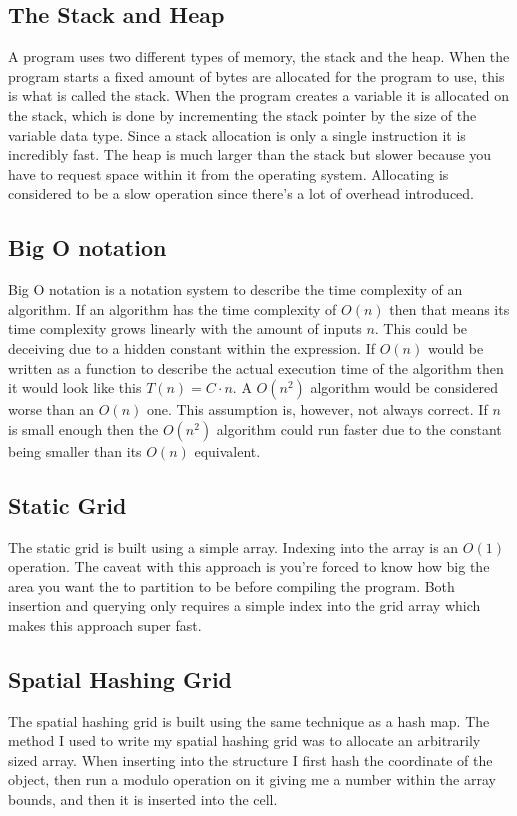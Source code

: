 \documentclass[a4paper, 12pt]{article}
\begin{document}
\subsection{The Stack and Heap}
A program uses two different types of memory, the stack and the heap. When the
program starts a fixed amount of bytes are allocated for the program to use,
this is what is called the stack. When the program creates a variable it is
allocated on the stack, which is done by incrementing the stack pointer by the
size of the variable data type. Since a stack allocation is only a single
instruction it is incredibly fast. The heap is much larger than the stack but
slower because you have to request space within it from the operating system.
Allocating is considered to be a slow operation since there's a lot of overhead
introduced.

\subsection{Big O notation}
Big O notation is a notation system to describe the time complexity of an
algorithm. If an algorithm has the time complexity of $O(n)$ then that means
its time complexity grows linearly with the amount of inputs $n$. This could be
deceiving due to a hidden constant within the expression. If $O(n)$ would be
written as a function to describe the actual execution time of the algorithm
then it would look like this $T(n) = C \cdot n$. A $O(n^{2})$ algorithm would
be considered worse than an $O(n)$ one. This assumption is, however, not always
correct. If $n$ is small enough then the $O(n^{2})$ algorithm could run faster
due to the constant being smaller than its $O(n)$ equivalent.

\subsection{Static Grid}
The static grid is built using a simple array. Indexing into the array is an
$O(1)$ operation. The caveat with this approach is you're forced to know how
big the area you want the to partition to be before compiling the program. Both
insertion and querying only requires a simple index into the grid array which
makes this approach super fast.

\subsection{Spatial Hashing Grid}
The spatial hashing grid is built using the same technique as a hash map. The
method I used to write my spatial hashing grid was to allocate an arbitrarily
sized array. When inserting into the structure I first hash the coordinate of
the object, then run a modulo operation on it giving me a number within the
array bounds, and then it is inserted into the cell.
\end{document}
